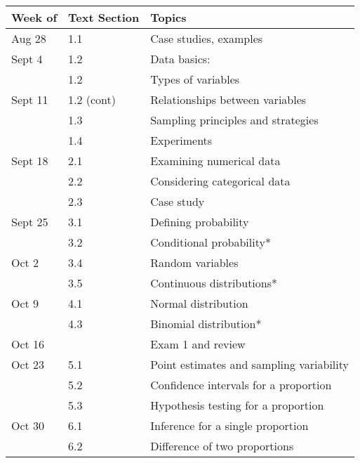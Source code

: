 \begin{table}[!ht]
	\centering
	\begin{tabular}{|l|l|l|}
		\hline
		Week of & Text Section & Topics \\ \hline
		Aug 28 &  1.1   & Case studies, examples \\ 
		\hline
		Sept 4 &  1.2   & Data basics:\\   
	      & 1.2  &  Types of variables    \\
	      \hline
	      
	  Sept 11    & 1.2 (cont) & Relationships between variables  \\
	       & 1.3 & Sampling principles and strategies \\
	        &  1.4 & Experiments \\
		\hline 

  	Sept 18  & 2.1  &  Examining numerical data \\
     &  2.2 & Considering categorical data  \\
     &  2.3 & Case study \\
		\hline 
		
 	Sept 25	 & 3.1   & Defining probability   \\
		 & 3.2 & Conditional probability* \\
	\hline
	
	Oct 2	 & 3.4 & Random variables \\
		 & 3.5 & Continuous distributions* \\
		 
		\hline 
		
	Oct 9 & 4.1 & Normal distribution    \\
	   &  	4.3  & Binomial distribution*   \\
	   
	   \hline 
	   
  Oct 16	 & & Exam 1 and review \\
  \hline
  
  
  Oct 23  & 5.1 &  Point estimates and sampling variability \\ 
		
	 &  5.2 & Confidence intervals for a proportion   \\
		 & 5.3 & Hypothesis testing for a proportion   \\
		 
		
		 
		\hline 
		
 Oct 30	 &  6.1 & Inference for a single proportion  \\
		  & 6.2 & Difference of two proportions \\
		 

\end{tabular}
\end{table}
